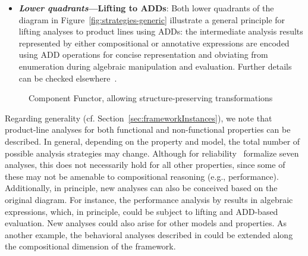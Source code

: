 \begin{itemize}
	\item \textbf{\textit{Lower quadrants}---Lifting to ADDs}: Both lower quadrants of the diagram in Figure~\ref{fig:strategies-generic} illustrate a general principle for lifting analyses to product lines using ADDs: the intermediate analysis results represented by either compositional or annotative expressions are encoded using ADD operations for concise representation and obviating from enumeration during algebraic manipulation and evaluation. Further details can be checked elsewhere~\cite{Castro2017}.
\end{itemize}


\begin{figure}[htb]
	\centering
	\caption{Component Functor, allowing structure-preserving transformations}
	\label{fig:functor}
\end{figure}

Regarding generality (cf. Section~\ref{sec:frameworkInstances}), we note that product-line analyses for both functional and non-functional properties can be described. In general, depending on 
the property and model, the total number of possible analysis strategies may change. Although for reliability~\citet{Castro2017} formalize seven analyses, this does not necessarily hold for all other properties, since some of these  may not be
amenable to compositional reasoning (e.g., performance). 
Additionally, in principle, new analyses can also be conceived based on the original diagram. 
For instance, the performance analysis by \citet{kowal_scaling_2015} results in algebraic expressions, which, in principle, could be subject to lifting and ADD-based evaluation.
New analyses could also arise for other models and properties. As another example, the behavioral analyses described in  could be extended along the compositional dimension of the framework.

